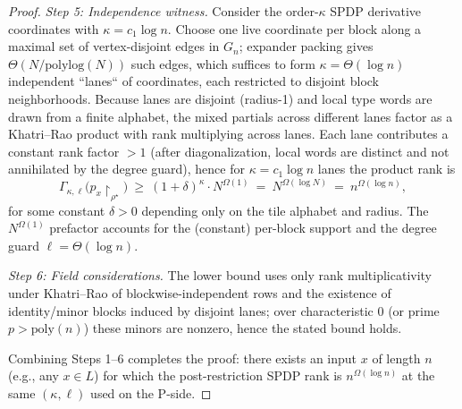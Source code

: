 \documentclass[12pt]{article}
\theoremstyle{definition}
\theoremstyle{definition}
\theoremstyle{remark}
\theoremstyle{remark}
\begin{document}
\begin{proof}
\emph{Step 5: Independence witness.}
Consider the order-$\kappa$ SPDP derivative coordinates with $\kappa=c_1\log n$.
Choose one live coordinate per block along a maximal set of vertex-disjoint edges
in $G_n$; expander packing gives $\Theta(N/\mathrm{polylog}(N))$ such edges,
which suffices to form $\kappa=\Theta(\log n)$ independent ``lanes`` of coordinates,
each restricted to disjoint block neighborhoods. Because lanes are disjoint
(radius-1) and local type words are drawn from a finite alphabet,
the mixed partials across different lanes factor as a Khatri--Rao product with
rank multiplying across lanes. Each lane contributes a constant rank factor $>1$
(after diagonalization, local words are distinct and not annihilated by the
degree guard), hence for $\kappa=c_1\log n$ lanes the product rank is
\[
\Gamma_{\kappa,\ell}\big(p_{x}\!\upharpoonright_{\rho^\star}\big)\ \ge\ (1+\delta)^{\kappa}\cdot N^{\Omega(1)}
\ =\ N^{\Omega(\log N)}
\ =\ n^{\Omega(\log n)} ,
\]
for some constant $\delta>0$ depending only on the tile alphabet and radius. The $N^{\Omega(1)}$
prefactor accounts for the (constant) per-block support and the degree guard $\ell=\Theta(\log n)$.

\emph{Step 6: Field considerations.}
The lower bound uses only rank multiplicativity under Khatri--Rao of blockwise-independent rows
and the existence of identity/minor blocks induced by disjoint lanes; over characteristic $0$
(or prime $p>\mathrm{poly}(n)$) these minors are nonzero, hence the stated bound holds.

Combining Steps 1--6 completes the proof: there exists an input $x$ of length $n$
(e.g., any $x\in L$) for which the post-restriction SPDP rank is $n^{\Omega(\log n)}$
at the same $(\kappa,\ell)$ used on the P-side.
\end{proof}
\end{document}
